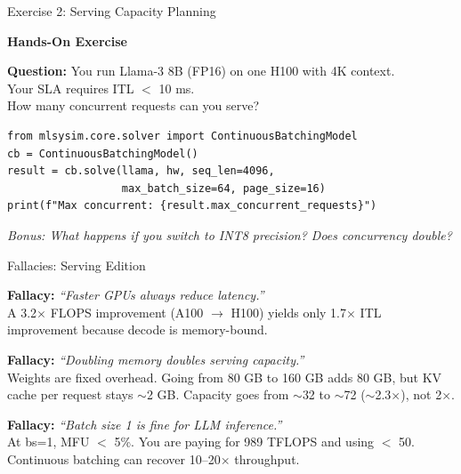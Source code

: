 \documentclass[aspectratio=169, 12pt]{beamer}
\begin{document}
\begin{frame}[fragile]{Exercise 2: Serving Capacity Planning}

\centering
\Large\bfseries
Hands-On Exercise\\[0.5cm]
\normalsize

\textbf{Question:} You run Llama-3 8B (FP16) on one H100 with 4K context.\\
Your SLA requires ITL $<$ 10 ms.\\
How many concurrent requests can you serve?

\vspace{0.3cm}
\begin{lstlisting}
from mlsysim.core.solver import ContinuousBatchingModel
cb = ContinuousBatchingModel()
result = cb.solve(llama, hw, seq_len=4096,
                  max_batch_size=64, page_size=16)
print(f"Max concurrent: {result.max_concurrent_requests}")
\end{lstlisting}

\vspace{0.2cm}
\textit{Bonus: What happens if you switch to INT8 precision?
Does concurrency double?}
\end{frame}

\begin{frame}{Fallacies: Serving Edition}

\small
\textbf{Fallacy:} \textit{``Faster GPUs always reduce latency.''}\\
A 3.2$\times$ FLOPS improvement (A100 $\to$ H100) yields only
1.7$\times$ ITL improvement because decode is memory-bound.

\vspace{0.3cm}
\textbf{Fallacy:} \textit{``Doubling memory doubles serving capacity.''}\\
Weights are fixed overhead. Going from 80 GB to 160 GB adds 80 GB,
but KV cache per request stays $\sim$2 GB. Capacity goes from $\sim$32
to $\sim$72 ($\sim$2.3$\times$), not 2$\times$.

\vspace{0.3cm}
\textbf{Fallacy:} \textit{``Batch size 1 is fine for LLM inference.''}\\
At bs=1, MFU $<$ 5\%. You are paying for 989 TFLOPS and using $<$ 50.
Continuous batching can recover 10--20$\times$ throughput.
\end{frame}
\end{document}
